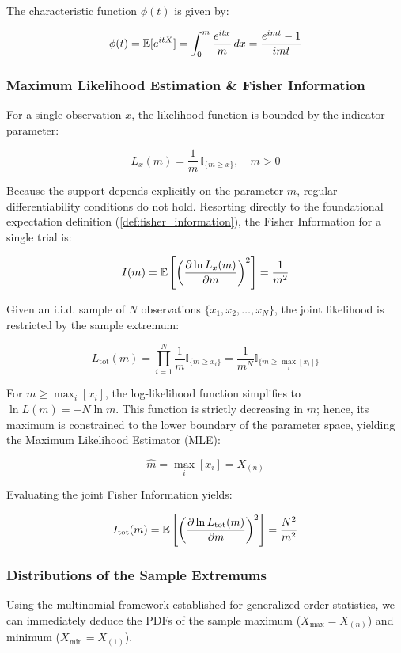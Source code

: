 The characteristic function $\phi(t)$ is given by:

	\[
	\phi(t) = \mathbb{E}[e^{itX}] = \int_{0}^{m} \frac{e^{itx}}{m}\,dx = \frac{e^{imt}-1}{imt}
	\]

\subsubsection{Maximum Likelihood Estimation \& Fisher Information}
For a single observation $x$, the likelihood function is bounded by the indicator parameter:

	\[
	L_x(m) = \frac{1}{m}\,\mathbb{I}_{\{m \geq x\}}, \quad m>0
	\]

Because the support depends explicitly on the parameter $m$, regular differentiability conditions do not hold. Resorting directly to the foundational expectation definition (\ref{def:fisher_information}), the Fisher Information for a single trial is:

	\[
	I(m) = \mathbb{E} \left[\left(\frac{\partial \ln L_x(m)}{\partial m}\right)^2 \right] = \frac{1}{m^2}
	\]

Given an i.i.d. sample of $N$ observations $\{x_1, x_2, \dots, x_N\}$, the joint likelihood is restricted by the sample extremum:

	\[
	L_{\text{tot}}(m) = \prod_{i=1}^N\frac{1}{m}\mathbb{I}_{\{m\geq x_i\}} = \frac{1}{m^N}\mathbb{I}_{\{m\geq \max_i [x_i]\}}
	\]

For $m \ge \max_i [x_i]$, the log-likelihood function simplifies to $\ln L(m) = -N \ln m$. This function is strictly decreasing in $m$; hence, its maximum is constrained to the lower boundary of the parameter space, yielding the Maximum Likelihood Estimator (MLE):

\begin{equation}
	\hat{m} = \max_i [x_i] = X_{(n)}
	\label{eq:uniform_mle}
\end{equation}

Evaluating the joint Fisher Information yields:

	\[
	I_{\text{tot}}(m) = \mathbb{E} \left[\left(\frac{\partial \ln L_{\text{tot}}(m)}{\partial m}\right)^2 \right] = \frac{N^2}{m^2}
	\]

\subsubsection{Distributions of the Sample Extremums}
Using the multinomial framework established for generalized order statistics, we can immediately deduce the PDFs of the sample maximum ($X_{\max} = X_{(n)}$) and minimum ($X_{\min} = X_{(1)}$).


